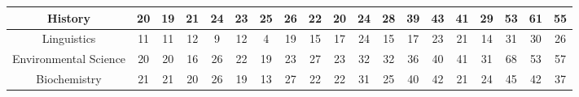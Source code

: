 \documentclass[10pt]{article}
\begin{document}
\begin{landscape}
\begin{longtable}[c]{|ccccccccccccccccccc|}
	\multicolumn{1}{|c|}{History}                                    & \multicolumn{1}{c|}{20}         & \multicolumn{1}{c|}{19}         & \multicolumn{1}{c|}{21}         & \multicolumn{1}{c|}{24}         & \multicolumn{1}{c|}{23}         & \multicolumn{1}{c|}{25}         & \multicolumn{1}{c|}{26}         & \multicolumn{1}{c|}{22}         & \multicolumn{1}{c|}{20}         & \multicolumn{1}{c|}{24}         & \multicolumn{1}{c|}{28}         & \multicolumn{1}{c|}{39}         & \multicolumn{1}{c|}{43}         & \multicolumn{1}{c|}{41}         & \multicolumn{1}{c|}{29}         & \multicolumn{1}{c|}{53}         & \multicolumn{1}{c|}{61}         & 55         \\ \hline
	\multicolumn{1}{|c|}{Linguistics}                                & \multicolumn{1}{c|}{11}         & \multicolumn{1}{c|}{11}         & \multicolumn{1}{c|}{12}         & \multicolumn{1}{c|}{9}          & \multicolumn{1}{c|}{12}         & \multicolumn{1}{c|}{4}          & \multicolumn{1}{c|}{19}         & \multicolumn{1}{c|}{15}         & \multicolumn{1}{c|}{17}         & \multicolumn{1}{c|}{24}         & \multicolumn{1}{c|}{15}         & \multicolumn{1}{c|}{17}         & \multicolumn{1}{c|}{23}         & \multicolumn{1}{c|}{21}         & \multicolumn{1}{c|}{14}         & \multicolumn{1}{c|}{31}         & \multicolumn{1}{c|}{30}         & 26         \\ \hline
	\multicolumn{1}{|c|}{Environmental Science}                      & \multicolumn{1}{c|}{20}         & \multicolumn{1}{c|}{20}         & \multicolumn{1}{c|}{16}         & \multicolumn{1}{c|}{26}         & \multicolumn{1}{c|}{22}         & \multicolumn{1}{c|}{19}         & \multicolumn{1}{c|}{23}         & \multicolumn{1}{c|}{27}         & \multicolumn{1}{c|}{23}         & \multicolumn{1}{c|}{32}         & \multicolumn{1}{c|}{32}         & \multicolumn{1}{c|}{36}         & \multicolumn{1}{c|}{40}         & \multicolumn{1}{c|}{41}         & \multicolumn{1}{c|}{31}         & \multicolumn{1}{c|}{68}         & \multicolumn{1}{c|}{53}         & 57         \\ \hline
	\multicolumn{1}{|c|}{Biochemistry}                               & \multicolumn{1}{c|}{21}         & \multicolumn{1}{c|}{21}         & \multicolumn{1}{c|}{20}         & \multicolumn{1}{c|}{26}         & \multicolumn{1}{c|}{19}         & \multicolumn{1}{c|}{13}         & \multicolumn{1}{c|}{27}         & \multicolumn{1}{c|}{22}         & \multicolumn{1}{c|}{22}         & \multicolumn{1}{c|}{31}         & \multicolumn{1}{c|}{25}         & \multicolumn{1}{c|}{40}         & \multicolumn{1}{c|}{42}         & \multicolumn{1}{c|}{21}         & \multicolumn{1}{c|}{24}         & \multicolumn{1}{c|}{45}         & \multicolumn{1}{c|}{42}         & 37         \\ \hline

\end{longtable}
\end{landscape}
\end{document}
